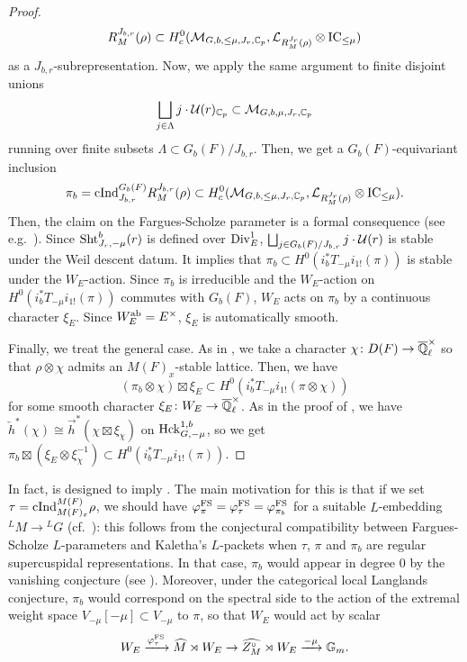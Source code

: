 \documentclass[12pt,reqno]{amsart}
\begin{document}
\begin{proof}
    \[
        R^{J_{b, r}}_M(\rho) \subset H_c^0({\mathcal{M}}_{G, b, \leq \mu, J_r, \mathbb{C}_p}, {\mathcal{L}}_{R^{J_r}_M(\rho)} \otimes {\operatorname{IC}}_{\leq \mu})
    \]
    as a $J_{b, r}$-subrepresentation. Now, we apply the same argument to finite disjoint unions 
    \[
        \bigsqcup_{j \in \Lambda} j \cdot {\mathcal{U}}(r)_{\mathbb{C}_p} \subset {\mathcal{M}}_{G, b, \mu, J_r, \mathbb{C}_p}
    \]
    running over finite subsets $\Lambda \subset G_b(F) / J_{b, r}$. Then, we get a $G_b(F)$-equivariant inclusion
    \[
        \pi_b = {\operatorname{cInd}}_{J_{b, r}}^{G_b(F)} R^{J_{b, r}}_M(\rho) \subset H_c^0({\mathcal{M}}_{G, b, \leq \mu, J_r, \mathbb{C}_p}, {\mathcal{L}}_{R^{J_r}_M(\rho)} \otimes {\operatorname{IC}}_{\leq \mu}). 
    \]
    Then, the claim on the Fargues-Scholze parameter is a formal consequence (see e.g.\ \cite[Corollary 7.23]{Tak25z}). Since ${\operatorname{Sht}}_{J_r, -\mu}^b(r)$ is defined over ${\operatorname{Div}}^1_E$, $\bigsqcup_{j \in G_b(F) / J_{b, r}} j \cdot {\mathcal{U}}(r)$ is stable under the Weil descent datum. It implies that $\pi_b \subset H^0(i_b^* T_{-\mu} i_{1!}(\pi))$ is stable under the $W_E$-action. Since $\pi_b$ is irreducible and the $W_E$-action on $H^0(i_b^* T_{-\mu} i_{1!}(\pi))$ commutes with $G_b(F)$, $W_E$ acts on $\pi_b$ by a continuous character $\xi_E$. Since $W_E^{\operatorname{ab}} = E^\times$, $\xi_E$ is automatically smooth. 

    Finally, we treat the general case. As in , we take a character $\chi \colon D(F) \to {\overline{\mathbb{Q}}_\ell^\times}$ so that $\rho \otimes \chi$ admits an $M(F)_x$-stable lattice. Then, we have
    \[
        (\pi_b \otimes \chi) \boxtimes \xi_E \subset H^0(i_b^* T_{-\mu} i_{1!}(\pi \otimes \chi))
    \]
    for some smooth character $\xi_E \colon W_E \to {\overline{\mathbb{Q}}_\ell^\times}$. As in the proof of , we have $\overleftarrow{h}^*(\chi) \cong \overrightarrow{h}^*(\chi \boxtimes \xi_\chi)$ on ${\operatorname{Hck}}_{G, -\mu}^{1, b}$, so we get 
    $
        \pi_b \boxtimes (\xi_E \otimes \xi_\chi^{-1}) \subset H^0(i_b^* T_{-\mu} i_{1!}(\pi)). 
    $
\end{proof}
\begin{rmk}
    In fact,  is designed to imply . The main motivation for this is that if we set $\tau = {\operatorname{cInd}}_{M(F)_x}^{M(F)} \rho$, we should have $\varphi_\pi^{\operatorname{FS}} = \varphi_\tau^{\operatorname{FS}} = \varphi_{\pi_b}^{\operatorname{FS}}$ for a suitable $L$-embedding ${}^LM \to {}^LG$ (cf.\ \cite[Lemma 5.2.6]{Kal19}): this follows from the conjectural compatibility between Fargues-Scholze $L$-parameters and Kaletha's $L$-packets when $\tau$, $\pi$ and $\pi_b$ are regular supercuspidal representations. In that case, $\pi_b$ would appear in degree $0$ by the vanishing conjecture (see \cite[Conjecture 1.1 (2)]{HJ25}). Moreover, under the categorical local Langlands conjecture, $\pi_b$ would correspond on the spectral side to the action of the extremal weight space $V_{-\mu}[-\mu] \subset V_{-\mu}$ to $\pi$, so that $W_E$ would act by scalar
    \[
        W_E \xrightarrow{\varphi_\tau^{\operatorname{FS}}} \widehat{M} \rtimes W_E \to \widehat{Z_M^\circ} \rtimes W_E \xrightarrow{-\mu} \mathbb{G}_m. 
    \]
\end{rmk}
\end{document}
